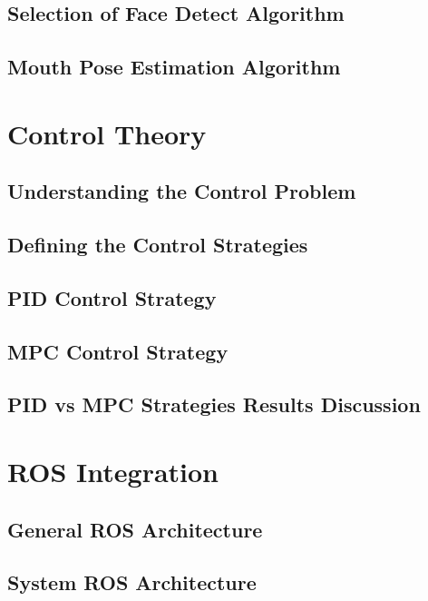 \documentclass[11pt]{report} %
\begin{document}
\section{Selection of Face Detect Algorithm}

\section{Mouth Pose Estimation Algorithm}

\chapter{Control Theory}

\section{Understanding the Control Problem}

\section{Defining the Control Strategies}

\section{PID Control Strategy}

\section{MPC Control Strategy}

\section{PID vs MPC Strategies Results Discussion}

\chapter{ROS Integration}

\section{General ROS Architecture}

\section{System ROS Architecture}
\end{document}
